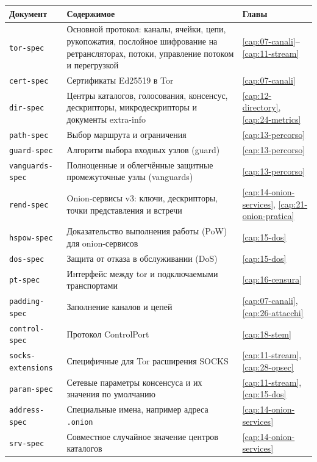\begin{center}\small
\begin{tabularx}{\textwidth}{@{}l>{\raggedright\arraybackslash}Xl@{}}
\toprule
Документ & Содержимое & Главы \\
\midrule
\texttt{tor-spec} & Основной протокол: каналы, ячейки, цепи, рукопожатия, послойное шифрование на ретрансляторах, потоки, управление потоком и перегрузкой & \ref{cap:07-canali}--\ref{cap:11-stream} \\
\texttt{cert-spec} & Сертификаты Ed25519 в Tor & \ref{cap:07-canali} \\
\texttt{dir-spec} & Центры каталогов, голосования, консенсус, дескрипторы, микродескрипторы и документы extra-info & \ref{cap:12-directory}, \ref{cap:24-metrics} \\
\texttt{path-spec} & Выбор маршрута и ограничения & \ref{cap:13-percorso} \\
\texttt{guard-spec} & Алгоритм выбора входных узлов (guard) & \ref{cap:13-percorso} \\
\texttt{vanguards-spec} & Полноценные и облегчённые защитные промежуточные узлы (vanguards) & \ref{cap:13-percorso} \\
\texttt{rend-spec} & Onion-сервисы v3: ключи, дескрипторы, точки представления и встречи & \ref{cap:14-onion-services}, \ref{cap:21-onion-pratica} \\
\texttt{hspow-spec} & Доказательство выполнения работы (PoW) для onion-сервисов & \ref{cap:15-dos} \\
\texttt{dos-spec} & Защита от отказа в обслуживании (DoS) & \ref{cap:15-dos} \\
\texttt{pt-spec} & Интерфейс между tor и подключаемыми транспортами & \ref{cap:16-censura} \\
\texttt{padding-spec} & Заполнение каналов и цепей & \ref{cap:07-canali}, \ref{cap:26-attacchi} \\
\texttt{control-spec} & Протокол ControlPort & \ref{cap:18-stem} \\
\texttt{socks-extensions} & Специфичные для Tor расширения SOCKS & \ref{cap:11-stream}, \ref{cap:28-opsec} \\
\texttt{param-spec} & Сетевые параметры консенсуса и их значения по умолчанию & \ref{cap:11-stream}, \ref{cap:15-dos} \\
\texttt{address-spec} & Специальные имена, например адреса \texttt{.onion} & \ref{cap:14-onion-services} \\
\texttt{srv-spec} & Совместное случайное значение центров каталогов & \ref{cap:14-onion-services} \\
\bottomrule
\end{tabularx}
\end{center}

